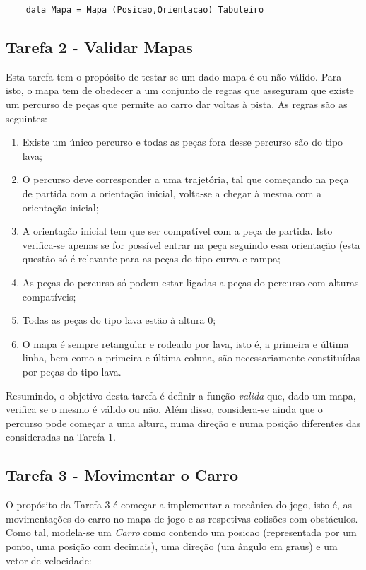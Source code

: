 \documentclass[a4paper]{report}
\begin{document}
\begin{verbatim}
    data Mapa = Mapa (Posicao,Orientacao) Tabuleiro
\end{verbatim}

\subsection{Tarefa 2 - Validar Mapas}
\label{analisetarefa2}

Esta tarefa tem o propósito de testar se um dado mapa é ou não válido. Para isto, o mapa tem de obedecer a um conjunto de regras que asseguram que existe um percurso de peças que permite ao carro dar voltas à pista. As regras são as seguintes:

\begin{enumerate}
    \item Existe um único percurso e todas as peças fora desse percurso são do tipo lava;
    \item O percurso deve corresponder a uma trajetória, tal que começando na peça de partida com a orientação inicial, volta-se a chegar à mesma com a orientação inicial;
    \item A orientação inicial tem que ser compatível com a peça de partida. Isto verifica-se apenas se for possível entrar na peça seguindo essa orientação (esta questão só é relevante para as peças do tipo curva e rampa;
    \item As peças do percurso só podem estar ligadas a peças do percurso com alturas compatíveis;
    \item Todas as peças do tipo lava estão à altura 0;
    \item O mapa é sempre retangular e rodeado por lava, isto é, a primeira e última linha, bem como a primeira e última coluna, são necessariamente constituídas por peças do tipo lava.
\end{enumerate}

Resumindo, o objetivo desta tarefa é definir a função \textit{valida} que, dado um mapa, verifica se o mesmo é válido ou não. Além disso, considera-se ainda que o percurso pode começar a uma altura, numa direção e numa posição diferentes das consideradas na Tarefa 1.

\subsection{Tarefa 3 - Movimentar o Carro}
\label{analisetarefa3}

O propósito da Tarefa 3 é começar a implementar a mecânica do jogo, isto é, as movimentações do carro no mapa de jogo e as respetivas colisões com obstáculos. Como tal, modela-se um \textit{Carro} como contendo um posicao (representada por um ponto, uma posição com decimais), uma direção (um ângulo em graus) e um vetor de velocidade:
\end{document}
